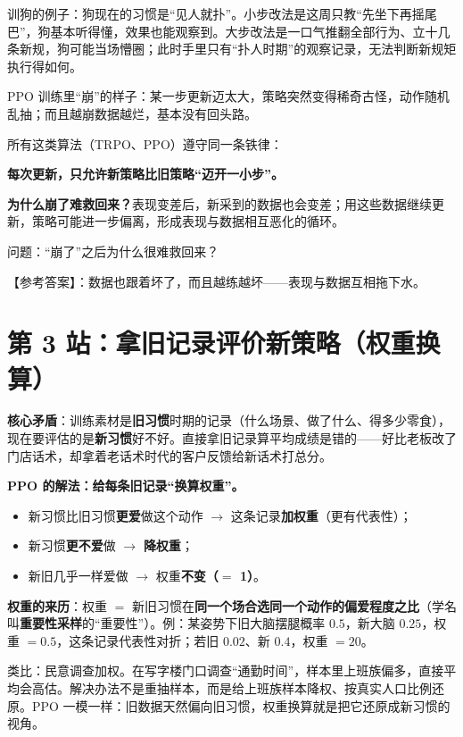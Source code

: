 \documentclass[UTF8,12pt,a4paper]{ctexrep}
\newcommand{\plain}[1]{\begin{plainbox}#1\end{plainbox}}
\newcommand{\pin}[1]{\begin{pinbox}#1\end{pinbox}}
\newcommand{\selfcheck}[1]{\begin{checkb}#1\end{checkb}}
\begin{document}
\plain{训狗的例子：狗现在的习惯是``见人就扑''。小步改法是这周只教``先坐下再摇尾巴''，狗基本听得懂，效果也能观察到。大步改法是一口气推翻全部行为、立十几条新规，狗可能当场懵圈；此时手里只有``扑人时期''的观察记录，无法判断新规矩执行得如何。}

PPO 训练里``崩''的样子：某一步更新迈太大，策略突然变得稀奇古怪，动作随机乱抽；而且越崩数据越烂，基本没有回头路。

所有这类算法（TRPO、PPO）遵守同一条铁律：

\pin{\textbf{每次更新，只允许新策略比旧策略``迈开一小步''。}}

\textbf{为什么崩了难救回来？}表现变差后，新采到的数据也会变差；用这些数据继续更新，策略可能进一步偏离，形成表现与数据相互恶化的循环。

\selfcheck{问题：``崩了''之后为什么很难救回来？
	
\noindent【参考答案】：数据也跟着坏了，而且越练越坏——表现与数据互相拖下水。}

\section{第 3 站：拿旧记录评价新策略（权重换算）}

\textbf{核心矛盾}：训练素材是\textbf{旧习惯}时期的记录（什么场景、做了什么、得多少零食），现在要评估的是\textbf{新习惯}好不好。直接拿旧记录算平均成绩是错的——好比老板改了门店话术，却拿着老话术时代的客户反馈给新话术打总分。

\textbf{PPO 的解法：给每条旧记录``换算权重''。}

\begin{itemize}[nosep]
  \item 新习惯比旧习惯\textbf{更爱}做这个动作 $\to$ 这条记录\textbf{加权重}（更有代表性）；
  \item 新习惯\textbf{更不爱}做 $\to$ \textbf{降权重}；
  \item 新旧几乎一样爱做 $\to$ 权重\textbf{不变（$=$ 1）}。
\end{itemize}

\textbf{权重的来历}：权重 $=$ 新旧习惯在\textbf{同一个场合选同一个动作的偏爱程度之比}（学名叫\textbf{重要性采样}的``重要性''）。例：某姿势下旧大脑摆腿概率 $0.5$，新大脑 $0.25$，权重 $= 0.5$，这条记录代表性对折；若旧 $0.02$、新 $0.4$，权重 $= 20$。

\plain{类比：民意调查加权。在写字楼门口调查``通勤时间''，样本里上班族偏多，直接平均会高估。解决办法不是重抽样本，而是给上班族样本降权、按真实人口比例还原。PPO 一模一样：旧数据天然偏向旧习惯，权重换算就是把它还原成新习惯的视角。}
\end{document}
